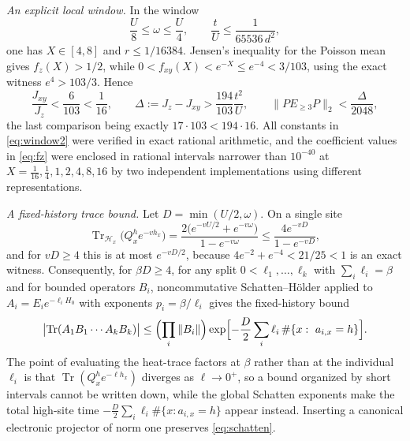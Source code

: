 \documentclass[11pt]{article}
\theoremstyle{definition}
\theoremstyle{remark}
\begin{document}
\emph{An explicit local window.} In the window
\begin{equation}
\frac U8\le\omega\le\frac U4,\qquad \frac tU\le\frac1{65536\,d^{2}},
\label{eq:window}
\end{equation}
one has $X\in[4,8]$ and $r\le1/16384$. Jensen's inequality for the Poisson mean
gives $f_{z}(X)>1/2$, while $0<f_{xy}(X)<e^{-X}\le e^{-4}<3/103$, using the exact
witness $e^{4}>103/3$. Hence
\begin{equation}
\frac{J_{xy}}{J_{z}}<\frac{6}{103}<\frac1{16},\qquad
\Delta:=J_{z}-J_{xy}>\frac{194}{103}\frac{t^{2}}{U},\qquad
\|PE_{\ge3}P\|_{2}<\frac{\Delta}{2048},
\label{eq:window2}
\end{equation}
the last comparison being exactly $17\cdot103<194\cdot16$. All constants in
\eqref{eq:window2} were verified in exact rational arithmetic, and the
coefficient values in \eqref{eq:fz} were enclosed in rational intervals narrower
than $10^{-40}$ at $X=\frac1{16},\frac14,1,2,4,8,16$ by two independent
implementations using different representations.

\emph{A fixed-history trace bound.} Let $D=\min(U/2,\omega)$. On a single site
\begin{equation}
\operatorname{Tr}_{\mathcal H_{x}}\bigl(Q_{x}^{h}e^{-vh_{x}}\bigr)
=\frac{2\bigl(e^{-vU/2}+e^{-v\omega}\bigr)}{1-e^{-v\omega}}
\le\frac{4e^{-vD}}{1-e^{-vD}},
\label{eq:htrace}
\end{equation}
and for $vD\ge4$ this is at most $e^{-vD/2}$, because
$4e^{-2}+e^{-4}<21/25<1$ is an exact witness. Consequently, for
$\beta D\ge4$, for any split $0<\ell_{1},\dots,\ell_{k}$ with
$\sum_{i}\ell_{i}=\beta$ and for bounded operators $B_{i}$, noncommutative
Schatten--H\"older applied to
$A_{i}=E_{i}e^{-\ell_{i}H_{0}}$ with exponents $p_{i}=\beta/\ell_{i}$ gives the
fixed-history bound
\begin{equation}
\bigl|\operatorname{Tr}(A_{1}B_{1}\cdots A_{k}B_{k})\bigr|
\le\Bigl(\prod_{i}\|B_{i}\|\Bigr)
\exp\Bigl[-\frac D2\sum_{i}\ell_{i}\,\#\{x:\ a_{i,x}=h\}\Bigr].
\label{eq:schatten}
\end{equation}
The point of evaluating the heat-trace factors at $\beta$ rather than at the
individual $\ell_{i}$ is that $\operatorname{Tr}(Q_{x}^{h}e^{-\ell h_{x}})$
diverges as $\ell\to0^{+}$, so a bound organized by short intervals cannot be
written down, while the global Schatten exponents make the total high-site time
$-\frac D2\sum_{i}\ell_{i}\#\{x:a_{i,x}=h\}$ appear instead. Inserting a canonical
electronic projector of norm one preserves \eqref{eq:schatten}.
\end{document}
